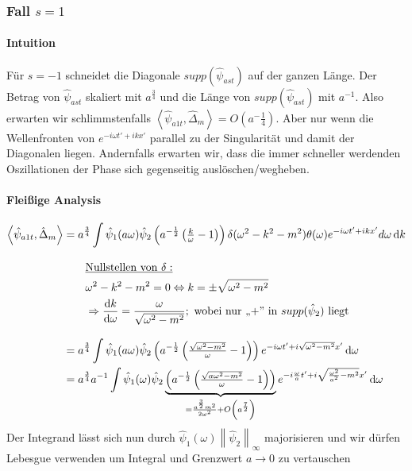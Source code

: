 \subsubsection*{Fall $s=1$}
\paragraph*{Intuition}
Für $s=-1$ schneidet die Diagonale  $supp (\hat \psi_{ast})$ auf der ganzen Länge. Der Betrag von $\hat\psi_{ast}$ skaliert mit $a^{\frac{3}{4}}$ und die Länge von $supp (\hat \psi_{ast})$ mit $a^{-1}$. Also erwarten wir schlimmstenfalls $\left< \hat \psi_{a1t}, \hat\Delta_m\right> = O(a^-{\frac{1}{4}})$. Aber nur wenn die Wellenfronten von $e^{-i\omega t'+i k x'}$ parallel zu der Singularität und damit der Diagonalen liegen. Andernfalls erwarten wir, dass die immer schneller werdenden Oszillationen der Phase sich gegenseitig auslöschen/wegheben.

\paragraph*{Fleißige Analysis}
\begin{align}
    \left<\hat \psi_{a1t} ,\hat \Delta_m\right> &=
        a^{\frac{3}{4}} \int \hat \psi_1(a\omega)
        \hat\psi_2\left(a^{-\frac{1}{2}} \left(\tfrac{k}{\omega}-1\right)\right)
        \delta (\omega^2 - k^2 - m^2) \theta(\omega)
        e^{-i\omega t' + ikx'} d \omega \mathop{}\!\mathrm{d} k \nonumber \\[2ex]
        & \kern 2em \underline{\textrm{Nullstellen von $\delta$}:}
        \nonumber \\
        & \kern 2em \omega^2 - k^2 - m^2 = 0 \Leftrightarrow k = \pm \sqrt{\omega^2-m^2}
        \nonumber \\
        & \kern 2em \Rightarrow \frac{\mathop{}\!\mathrm{d} k}{\mathop{}\!\mathrm{d} \omega} = \frac{\omega}{\sqrt{\omega^2-m^2}}; \textrm{   wobei nur ,,+'' in $supp (\hat \psi_2)$ liegt}
        \nonumber \\[2ex]
        &= a^{\frac{3}{4}} \int \hat\psi_1(a \omega)
        \hat\psi_2\left(a^{-\frac{1}{2}} \left(\tfrac{\sqrt{\omega^2-m^2}}{\omega}-1\right)\right)
        e^{-i\omega t' + i \sqrt{\omega^2-m^2}x'}
        \mathop{}\!\mathrm{d} \omega \nonumber \\
        &= a^{\frac{3}{4}} a^{-1} \int \hat\psi_1(\omega)
        \hat\psi_2
        \underbrace{
        \left(
            a^{-\frac{1}{2}} \left(\tfrac{\sqrt{a\omega^2-m^2}}{\omega}-1\right)
        \right)}_{= \frac{a^{\frac{3}{2}}m^2}{2 \omega^2}
                  + O\left(a^{\frac{7}{2}}\right)}
        e^{-i\frac{\omega}{a} t' + i \sqrt{\frac{\omega^2}{a^2}-m^2}x'}
        \mathop{}\!\mathrm{d} \omega \nonumber
\end{align}
Der Integrand lässt sich nun durch $\hat \psi_1(\omega) \left\lVert \hat\psi_2\right\lVert_\infty$ majorisieren und wir dürfen Lebesgue verwenden um Integral und Grenzwert $a \rightarrow 0$ zu vertauschen

